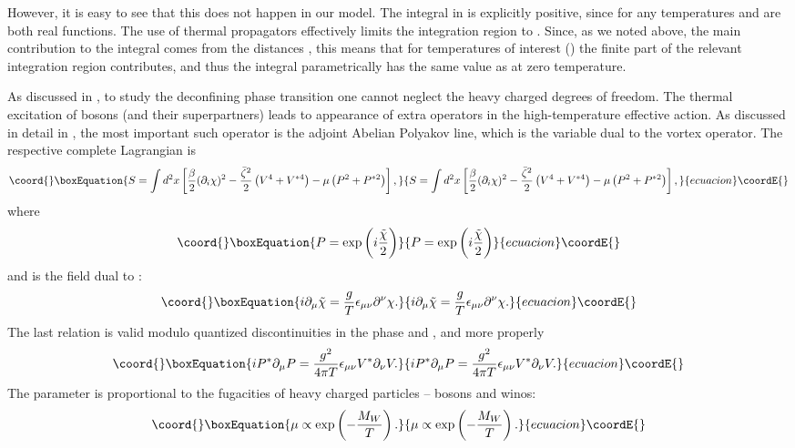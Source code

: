 \documentclass[a4paper,12pt]{article}
\begin{document}
However, it is easy to see that this does not happen in our model.
The integral in \coordHE{} is explicitly positive, since for any
temperatures \coordHE{} and \coordHE{} are both real functions. The
use of thermal propagators effectively limits the integration
region to \coordHE{}. Since, as we noted above, the main
contribution to the integral comes from the distances \coordHE{}, this means that for temperatures of interest (\coordHE{}) the finite part of the relevant integration region
contributes, and thus the integral parametrically has the same
value as at zero temperature.

As discussed in \cite{2,kk}, to study the deconfining phase
transition  one cannot neglect the heavy charged degrees of
freedom. The thermal excitation of \coordHE{} bosons (and their
superpartners) leads to appearance of extra operators in the high-temperature
effective action.  As discussed in detail in
\cite{2,kk}, the most important such operator is the adjoint
Abelian Polyakov line, which is the variable dual to the vortex
operator. The respective complete Lagrangian is
\begin{equation}\coord{}\boxEquation{ S=  \int d^2x\left[\frac\beta2(\partial_i\chi)^2-
{\bar\zeta^2\over 2}\left(V^4+V^{*4}\right)- \mu\left(P^2+P^{*2}\right)
\right],\label{comact}}{ S=  \int d^2x\left[\frac\beta2(\partial_i\chi)^2-
{\bar\zeta^2\over 2}\left(V^4+V^{*4}\right)- \mu\left(P^2+P^{*2}\right)
\right],}{ecuacion}\coordE{}\end{equation} where
\begin{equation}\coord{}\boxEquation{ P=\exp\left(i{\tilde\chi\over 2}\right) }{ P=\exp\left(i{\tilde\chi\over 2}\right) }{ecuacion}\coordE{}\end{equation}
and \myHighlight{$\tilde\chi$}\coordHE{}
is the field dual to \myHighlight{$\chi$}\coordHE{}:
 \begin{equation}\coord{}\boxEquation{ i\partial_{\mu}\tilde\chi= {g\over  T}
\epsilon_{\mu\nu}\partial^\nu \chi. \label{chid} }{ i\partial_{\mu}\tilde\chi= {g\over  T}
\epsilon_{\mu\nu}\partial^\nu \chi. }{ecuacion}\coordE{}\end{equation}
The last relation is valid modulo quantized discontinuities in the
phase \myHighlight{$\chi$}\coordHE{} and \myHighlight{$\tilde\chi$}\coordHE{}, and  more properly
\begin{equation}\coord{}\boxEquation{
iP^*\partial_\mu P ={g^2\over 4\pi
T}\epsilon_{\mu\nu}V^*\partial_\nu V.
}{
iP^*\partial_\mu P ={g^2\over 4\pi
T}\epsilon_{\mu\nu}V^*\partial_\nu V.
}{ecuacion}\coordE{}\end{equation}
The parameter \myHighlight{$\mu$}\coordHE{} is proportional to the fugacities of heavy
charged particles -- \coordHE{} bosons and winos:
\begin{equation}\coord{}\boxEquation{
\mu\propto \exp\left(-{M_W\over T}\right).
}{
\mu\propto \exp\left(-{M_W\over T}\right).
}{ecuacion}\coordE{}\end{equation}
\end{document}
